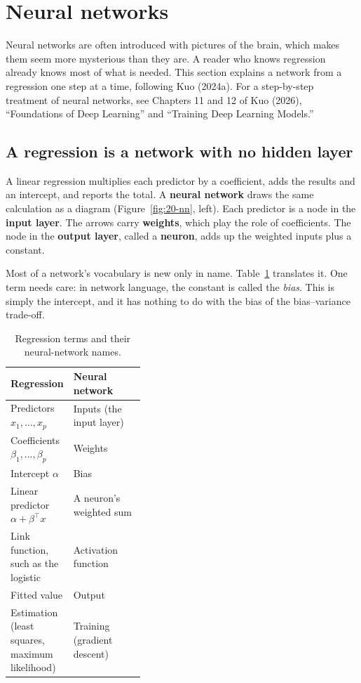 \section{Neural networks}
\label{sec:20-nn}

Neural networks are often introduced with pictures of the brain, which makes them seem more mysterious than they are. A reader who knows regression already knows most of what is needed. This section explains a network from a regression one step at a time, following Kuo (2024a). For a step-by-step treatment of neural networks, see Chapters 11 and 12 of Kuo (2026), ``Foundations of Deep Learning'' and ``Training Deep Learning Models.''

\subsection{A regression is a network with no hidden layer}

A linear regression multiplies each predictor by a coefficient, adds the results and an intercept, and reports the total. A \textbf{neural network} draws the same calculation as a diagram (Figure~\ref{fig:20-nn}, left). Each predictor is a node in the \textbf{input layer}. The arrows carry \textbf{weights}, which play the role of coefficients. The node in the \textbf{output layer}, called a \textbf{neuron}, adds up the weighted inputs plus a constant.

Most of a network's vocabulary is new only in name. Table~\ref{tab:20-nnterms} translates it. One term needs care: in network language, the constant is called the \emph{bias}. This is simply the intercept, and it has nothing to do with the bias of the bias--variance trade-off.

\begin{table}[htbp]
\centering
\small
\caption{Regression terms and their neural-network names.}
\label{tab:20-nnterms}
\begin{tabularx}{0.85\linewidth}{@{}>{\raggedright\arraybackslash}p{0.38\linewidth}>{\raggedright\arraybackslash}X@{}}
\toprule
Regression & Neural network \\
\midrule
Predictors $x_1, \dots, x_p$ & Inputs (the input layer) \\
Coefficients $\beta_1, \dots, \beta_p$ & Weights \\
Intercept $\alpha$ & Bias \\
Linear predictor $\alpha + \beta^{\top}x$ & A neuron's weighted sum \\
Link function, such as the logistic & Activation function \\
Fitted value & Output \\
Estimation (least squares, maximum likelihood) & Training (gradient descent) \\
\bottomrule
\end{tabularx}
\end{table}

